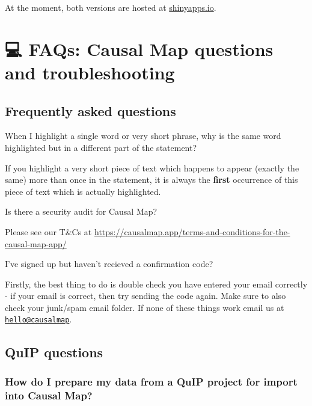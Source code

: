 \documentclass[
]{book}
\begin{document}
At the moment, both versions are hosted at \href{http://shinyapps.io}{shinyapps.io}.

\hypertarget{faqs-causal-map-questions-and-troubleshooting}{%
\chapter{💻 FAQs: Causal Map questions and troubleshooting}\label{faqs-causal-map-questions-and-troubleshooting}}

\hypertarget{frequently-asked-questions}{%
\section{Frequently asked questions}\label{frequently-asked-questions}}

When I highlight a single word or very short phrase, why is the same word highlighted but in a different part of the statement?

If you highlight a very short piece of text which happens to appear (exactly the same) more than once in the statement, it is always the \textbf{first} occurrence of this piece of text which is actually highlighted.

Is there a security audit for Causal Map?

Please see our T\&Cs at \url{https://causalmap.app/terms-and-conditions-for-the-causal-map-app/}

I've signed up but haven't recieved a confirmation code?

Firstly, the best thing to do is double check you have entered your email correctly - if your email is correct, then try sending the code again. Make sure to also check your junk/spam email folder. If none of these things work email us at \href{mailto:hello@causalmap}{\nolinkurl{hello@causalmap}}.

\hypertarget{quip-questions}{%
\section{QuIP questions}\label{quip-questions}}

\hypertarget{how-do-i-prepare-my-data-from-a-quip-project-for-import-into-causal-map}{%
\subsection{How do I prepare my data from a QuIP project for import into Causal Map?}\label{how-do-i-prepare-my-data-from-a-quip-project-for-import-into-causal-map}}
\end{document}
